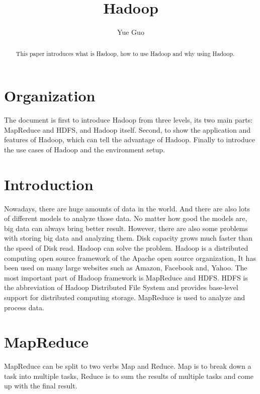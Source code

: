 
\title{Hadoop}



\author{Yue Guo}

\begin{abstract}
This paper introduces what is Hadoop, how to use Hadoop and why using Hadoop.
\end{abstract}


\maketitle

\section{Organization}
The document is first to introduce Hadoop from three levels, its two main parts: 
MapReduce and HDFS, and Hadoop itself. Second, to show the application and 
 features of Hadoop, which can tell the advantage of Hadoop. Finally 
 to introduce the use cases of Hadoop and the environment setup.

\section{Introduction}
Nowadays, there are huge amounts of data in the world. And there are also lots of
 different models to analyze those data. No matter how good the models are, big 
 data can always bring better result. However, there are also some problems with
  storing big data and analyzing them. Disk capacity grows much faster than the 
  speed of Disk read. Hadoop can solve the problem. Hadoop is a distributed 
  computing open source framework of the Apache open source organization, It has 
  been used on many large websites such as Amazon, Facebook and, Yahoo. The most 
  important part of Hadoop framework is MapReduce and HDFS. HDFS is the abbreviation 
  of Hadoop Distributed File System and provides base-level support for distributed 
  computing storage. MapReduce is used to analyze and process data.

\section{MapReduce}
MapReduce can be split to two verbs Map and Reduce. Map is to break down a task 
into multiple tasks, Reduce is to sum the results of multiple tasks and come up 
with the final result. 

